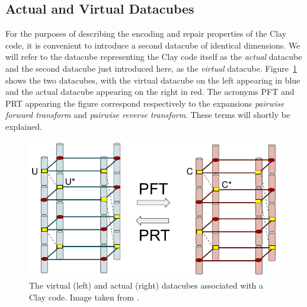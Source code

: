 \begin{multicols}{2}
 \subsection{Actual and Virtual Datacubes} 
 
 For the purposes of describing the encoding and repair properties of the Clay code, it is convenient to introduce a second datacube of identical dimensions.  We will refer to the datacube representing the Clay code itself as the {\em actual} datacube and the second datacube just introduced here, as the {\em virtual} datacube.  Figure~\ref{fig:actVirtCubes42} shows the two datacubes, with the virtual datacube on the left appearing in blue and the actual datacube appearing on the right in red.  The acronyms PFT and PRT appearing the figure correspond respectively to the expansions {\em pairwise forward transform} and {\em pairwise reverse transform}. These terms will shortly be explained. 

\begin{figure}[H]
\centering
\includegraphics[scale=.58]{src/Figures/chap4/actVirtCubes42}  
\caption{The virtual (left) and actual (right) datacubes associated with a Clay code.  Image taken from \cite{VajhaFAST18}. }  \label{fig:actVirtCubes42}    
\end{figure}
 

\end{multicols}
